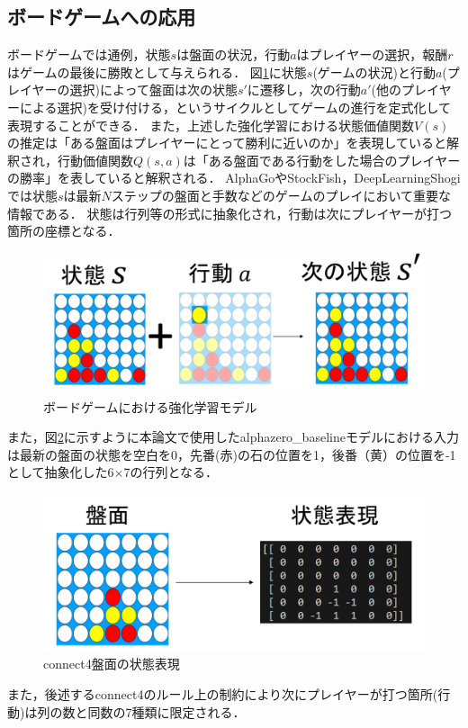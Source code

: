 \subsection{ボードゲームへの応用}
ボードゲームでは通例，状態$s$は盤面の状況，行動$a$はプレイヤーの選択，報酬$r$はゲームの最後に勝敗として与えられる．
図\ref{fig:board-game-model}に状態$s$(ゲームの状況)と行動$a$(プレイヤーの選択)によって盤面は次の状態$s'$に遷移し，次の行動$a'$(他のプレイヤーによる選択)を受け付ける，というサイクルとしてゲームの進行を定式化して表現することができる．
また，上述した強化学習における状態価値関数$V(s)$の推定は「ある盤面はプレイヤーにとって勝利に近いのか」を表現していると解釈され，行動価値関数$Q(s, a)$は「ある盤面である行動をした場合のプレイヤーの勝率」を表していると解釈される．
AlphaGo\cite{AlphaGo}やStockFish\cite{StockFish12}，DeepLearningShogi\cite{dlshogi}では状態$s$は最新$N$ステップの盤面と手数などのゲームのプレイにおいて重要な情報である．
状態は行列等の形式に抽象化され，行動は次にプレイヤーが打つ箇所の座標となる．
\begin{figure}[htbp]
	\includegraphics[width=\linewidth]{./figure/transition.png}
	\caption{ボードゲームにおける強化学習モデル}
	\label{fig:board-game-model}
\end{figure}

また，図\ref{fig:connect4-symbol}に示すように本論文で使用したalphazero\_baselineモデル\cite{baseline}における入力は最新の盤面の状態を空白を0，先番(赤)の石の位置を1，後番（黄）の位置を-1として抽象化した6$\times$7の行列となる．
\begin{figure}[htbp]
	\centering
	\includegraphics[width=\linewidth]{./figure/symbolic.png}
	\caption{connect4盤面の状態表現}
	\label{fig:connect4-symbol}
\end{figure}
また，後述するconnect4のルール上の制約により次にプレイヤーが打つ箇所(行動)は列の数と同数の7種類に限定される．

